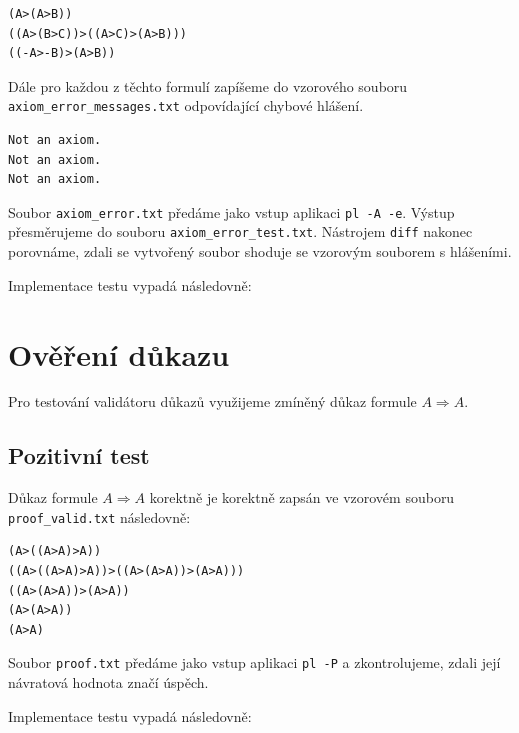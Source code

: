 \documentclass[thesis=B,czech,hidelinks]{thesis}[2012/06/26]
\begin{document}
\begin{verbatim}
(A>(A>B))
((A>(B>C))>((A>C)>(A>B)))
((-A>-B)>(A>B))
\end{verbatim}

Dále pro každou z těchto formulí zapíšeme do vzorového souboru \texttt{axiom\_error\_messages.txt} odpovídající chybové hlášení.

\begin{verbatim}
Not an axiom.
Not an axiom.
Not an axiom.
\end{verbatim}

Soubor \texttt{axiom\_error.txt} předáme jako vstup aplikaci \texttt{pl -A -e}. Výstup přesměrujeme do souboru \texttt{axiom\_error\_test.txt}. Nástrojem \texttt{diff} nakonec porovnáme, zdali se vytvořený soubor shoduje se vzorovým souborem s hlášeními.

Implementace testu vypadá následovně:

\begin{center}

\end{center}

\section{Ověření důkazu}

Pro testování validátoru důkazů využijeme zmíněný důkaz formule $A \Rightarrow A$\pageref{ex:proof}.

\subsection{Pozitivní test}

Důkaz formule $A \Rightarrow A$ korektně je korektně zapsán ve vzorovém souboru \texttt{proof\_valid.txt} následovně:

\begin{verbatim}
(A>((A>A)>A))
((A>((A>A)>A))>((A>(A>A))>(A>A)))
((A>(A>A))>(A>A))
(A>(A>A))
(A>A)
\end{verbatim}

Soubor \texttt{proof.txt} předáme jako vstup aplikaci \texttt{pl -P} a zkontrolujeme, zdali její návratová hodnota značí úspěch.

Implementace testu vypadá následovně:

\begin{center}

\end{center}
\end{document}
